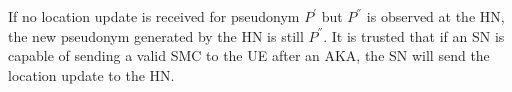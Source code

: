 \documentclass[portrait,a0]{a0poster}
\begin{document}
\begin{multicols}{2}
\noindent
If no location update is received for pseudonym $P^{'}$ but $P^{''}$ is observed at the HN, the new pseudonym generated by the HN is still $P^{''}$. It is trusted that if an SN is capable of sending a valid SMC to the UE after an AKA, the SN will send the location update to the HN.





\end{multicols}

\vfill %

\begin{minipage}[t]{0.9\linewidth} %
\footnotesize
{}
\end{minipage}
\end{document}
